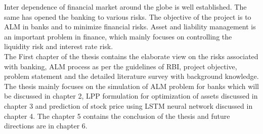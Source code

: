 Inter dependence of financial market around the globe is well established. The same has opened the banking to various risks. The objective of the project is to ALM in banks and to minimize financial risks. Asset and liability management is an important problem in finance, which mainly focuses on controlling the liquidity risk and interest rate risk.\\

The First chapter of the thesis contains the elaborate view on the risks associated with banking, ALM process as per the guidelines of RBI, project objective, problem statement and the detailed literature survey with background knowledge. The thesis mainly focuses on the simulation of ALM problem for banks which will be discussed in chapter 2, LPP formulation for optimization of assets discussed in chapter 3 and prediction of stock price using LSTM neural network discussed in chapter 4. The chapter 5 contains the conclusion of the thesis and future directions are in chapter 6.

